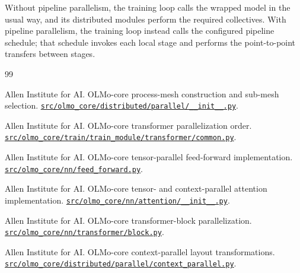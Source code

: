 \documentclass[11pt]{article}
\begin{document}
Without pipeline parallelism, the training loop calls the wrapped model in the
usual way, and its distributed modules perform the required collectives.
With pipeline parallelism, the training loop instead calls the configured
pipeline schedule; that schedule invokes each local stage and performs the
point-to-point transfers between stages.

\begin{thebibliography}{99}

Allen Institute for AI.
\newblock OLMo-core process-mesh construction and sub-mesh selection.
\newblock \href{https://github.com/allenai/OLMo-core/blob/92870a33c3fee060d57c3faec52b0b369ece85a6/src/olmo_core/distributed/parallel/__init__.py}{\nolinkurl{src/olmo_core/distributed/parallel/__init__.py}}.

Allen Institute for AI.
\newblock OLMo-core transformer parallelization order.
\newblock \href{https://github.com/allenai/OLMo-core/blob/92870a33c3fee060d57c3faec52b0b369ece85a6/src/olmo_core/train/train_module/transformer/common.py}{\nolinkurl{src/olmo_core/train/train_module/transformer/common.py}}.

Allen Institute for AI.
\newblock OLMo-core tensor-parallel feed-forward implementation.
\newblock \href{https://github.com/allenai/OLMo-core/blob/92870a33c3fee060d57c3faec52b0b369ece85a6/src/olmo_core/nn/feed_forward.py}{\nolinkurl{src/olmo_core/nn/feed_forward.py}}.

Allen Institute for AI.
\newblock OLMo-core tensor- and context-parallel attention implementation.
\newblock \href{https://github.com/allenai/OLMo-core/blob/92870a33c3fee060d57c3faec52b0b369ece85a6/src/olmo_core/nn/attention/__init__.py}{\nolinkurl{src/olmo_core/nn/attention/__init__.py}}.

Allen Institute for AI.
\newblock OLMo-core transformer-block parallelization.
\newblock \href{https://github.com/allenai/OLMo-core/blob/92870a33c3fee060d57c3faec52b0b369ece85a6/src/olmo_core/nn/transformer/block.py}{\nolinkurl{src/olmo_core/nn/transformer/block.py}}.

Allen Institute for AI.
\newblock OLMo-core context-parallel layout transformations.
\newblock \href{https://github.com/allenai/OLMo-core/blob/92870a33c3fee060d57c3faec52b0b369ece85a6/src/olmo_core/distributed/parallel/context_parallel.py}{\nolinkurl{src/olmo_core/distributed/parallel/context_parallel.py}}.


\end{thebibliography}
\end{document}
